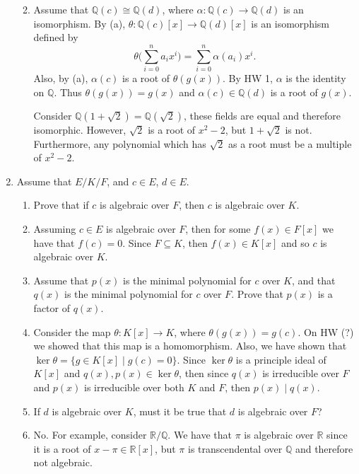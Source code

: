 \documentclass{article}
\makeatletter
\theoremstyle{definition}
\theoremstyle{remark}
\let\oldproofname=\proofname
\renewcommand{\proofname}{\textit{\oldproofname}}
\theoremstyle{definition}
\renewenvironment{proof}[1][\proofname]{\par
  \pushQED{\qed}%
  \normalfont \topsep6\p@\@plus6\p@\relax
  \list{}{\leftmargin=0mm
          \rightmargin=0mm
          \settowidth{\itemindent}{\itshape#1}%
          \labelwidth=\itemindent
          \parsep=0pt \listparindent=0mm%
  }
  \item[\hskip\labelsep
        \itshape
    #1\@addpunct{.}]\ignorespaces
}{%
  \popQED\endlist\@endpefalse
}
\makeatother
\begin{document}
\begin{enumerate}[leftmargin=*]
\begin{enumerate}
\begin{proof}
                    Assume that $\mathbb{Q}(c)\cong\mathbb{Q}(d)$, where $\alpha\colon\mathbb{Q}(c)\rightarrow\mathbb{Q}(d)$ is an isomorphism. By (a), $\theta\colon\mathbb{Q}(c)[x]\rightarrow\mathbb{Q}(d)[x]$ is an isomorphism defined by 
                        \begin{equation*}
                            \theta\big(\sum_{i=0}^na_ix^i\big)=\sum_{i=0}^n\alpha(a_i)x^i.
                        \end{equation*}
                    Also, by (a), $\alpha(c)$ is a root of $\theta(g(x))$. By HW 1, $\alpha$ is the identity on $\mathbb{Q}$. Thus $\theta(g(x))=g(x)$ and $\alpha(c)\in\mathbb{Q}(d)$ is a root of $g(x)$.\par\hspace{4mm} Consider $\mathbb{Q}(1+\sqrt{2})=\mathbb{Q}(\sqrt{2})$, these fields are equal and therefore isomorphic. However, $\sqrt{2}$ is a root of $x^2-2$, but $1+\sqrt{2}$ is not. Furthermore, any polynomial which has $\sqrt{2}$ as a root must be a multiple of $x^2-2$.
                \end{proof}
        \end{enumerate}
    \item Assume that $E/K/F$, and $c\in E$, $d\in E$.\hfill\par
        \begin{enumerate}
            \item Prove that if $c$ is algebraic over $F$, then $c$ is algebraic over $K$.
                \begin{proof}
                    Assuming $c\in E$ is algebraic over $F$, then for some $f(x)\in F[x]$ we have that $f(c)=0$. Since $F\subseteq K$, then $f(x)\in K[x]$ and so $c$ is algebraic over $K$.
                \end{proof}
            \item Assume that $p(x)$ is the minimal polynomial for $c$ over $K$, and that $q(x)$ is the minimal polynomial for $c$ over $F$. Prove that $p(x)$ is a factor of $q(x)$.
                \begin{proof}
                    Consider the map $\theta\colon K[x]\rightarrow K$, where $\theta(g(x))=g(c)$. On HW (?) we showed that this map is a homomorphism. Also, we have shown that $\ker\theta=\{g\in K[x]\mid g(c)=0\}$. Since $\ker\theta$ is a principle ideal of $K[x]$ and $q(x),p(x)\in\ker\theta$, then since $q(x)$ is irreducible over $F$ and $p(x)$ is irreducible over both $K$ and $F$, then $p(x)\mid q(x)$.
                \end{proof}
            \item If $d$ is algebraic over $K$, must it be true that $d$ is algebraic over $F$?
                \begin{proof}
                    No. For example, consider $\mathbb{R}/\mathbb{Q}$. We have that $\pi$ is algebraic over $\mathbb{R}$ since it is a root of $x-\pi\in\mathbb{R}[x]$, but $\pi$ is transcendental over $\mathbb{Q}$ and therefore not algebraic.
                \end{proof}
        \end{enumerate}
\end{enumerate}
\end{document}
